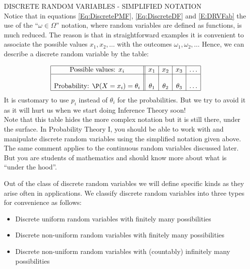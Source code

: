 \begin{framed}
DISCRETE RANDOM VARIABLES - SIMPLIFIED NOTATION\\

Notice that in equations \eqref{Eq:DiscretePMF}, \eqref{Eq:DiscreteDF} and \eqref{E:DRVFab} the use of the ``$\omega \in \Omega$'' notation, where random variables are defined as functions, is
much reduced. The reason is that in straightforward examples it is
convenient to associate the possible values $x_1,x_2,\dots$ with the
outcomes $\omega_1,\omega_2,\dots$ Hence, we can describe a discrete
random variable by the table:


$$\begin{array}{|c||c|c|c|c|}\hline
\textrm{Possible values: $x_i$} & x_1 & x_2 & x_3 & \ldots \\ \hline
&&&&\\
\textrm{Probability: $\P(X=x_i)=\theta_i$}& \theta_1 & \theta_2 & \theta_3 & \ldots \\ \hline
\end{array}
$$
It is customary to use $p_i$ instead of $\theta_i$ for the probabilities. But we try to avoid it as it will hurt us when we start doing Inference Theory soon!
\quad \\
Note that this table hides the more complex notation but it is still
there, under the surface. 
In Probability Theory I, you should be able to  work with and manipulate discrete random variables using the simplified notation given above. 
The same comment applies to the continuous random variables discussed later. But you are students of mathematics and should know more about what is ``under the hood''.

\end{framed}


Out of the class of discrete random variables we will define specific kinds as they arise often in applications.  We classify discrete random variables into three types for convenience as follows:
\begin{itemize}
\item {Discrete uniform random variables with finitely many possibilities}
\item {Discrete non-uniform random variables with finitely many possibilities}
\item {Discrete non-uniform random variables with (countably) infinitely many possibilities}
\end{itemize}

